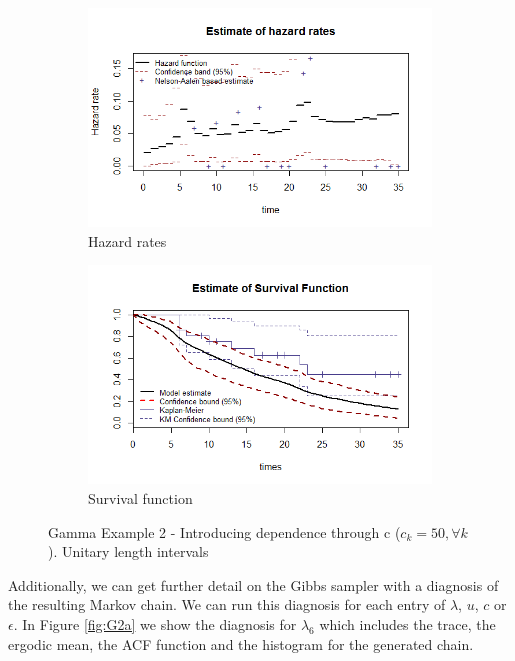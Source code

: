 \documentclass[letterpaper]{article}\usepackage[]{graphicx}\usepackage[]{color}
\begin{document}
\begin{figure}
  \centering
  \begin{subfigure}[a]{\textwidth}\centering
    \includegraphics[width=\textwidth]{G21.png}
    \caption{Hazard rates}
  \end{subfigure}
  \begin{subfigure}[b]{\textwidth}\centering
    \includegraphics[width=\textwidth]{G22.png}
    \caption{Survival function}
  \end{subfigure}
  \caption{Gamma Example 2 - Introducing dependence through c ($c_k=50, \forall k$). Unitary length intervals}
  \label{fig:G2}
\end{figure}

Additionally, we can get further detail on the Gibbs sampler with a diagnosis of the resulting Markov chain. We can run this diagnosis for each entry of $\lambda$, $u$, $c$ or $\epsilon$. In Figure \ref{fig:G2a} we show the diagnosis for $\lambda_6$ which includes the trace, the ergodic mean, the ACF function and the histogram for the generated chain.
\end{document}
